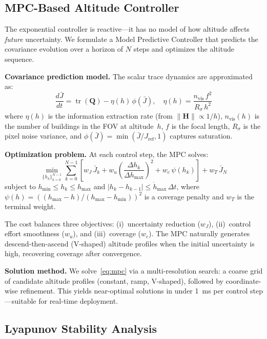 \documentclass[journal]{IEEEtran}
\newcommand{\vQ}{\mathbf{Q}}
\newcommand{\vH}{\mathbf{H}}
\newcommand{\tr}{\operatorname{tr}}
\begin{document}
\subsection{MPC-Based Altitude Controller}\label{sec:mpc}
The exponential controller is reactive---it has no model of how altitude affects \emph{future} uncertainty.
We formulate a Model Predictive Controller that predicts the covariance evolution over a horizon of $N$ steps and optimizes the altitude sequence.

\textbf{Covariance prediction model.}
The scalar trace dynamics are approximated as:
\begin{equation}\label{eq:trace_dyn}
    \frac{d\bar{J}}{dt} = \tr(\vQ) - \eta(h)\,\phi(\bar{J}), \quad \eta(h) = \frac{n_{\text{vis}}\,f^2}{R_\sigma\,h^2}
\end{equation}
where $\eta(h)$ is the information extraction rate (from $\|\vH\| \propto 1/h$), $n_{\text{vis}}(h)$ is the number of buildings in the FOV at altitude~$h$, $f$ is the focal length, $R_\sigma$ is the pixel noise variance, and $\phi(\bar{J}) = \min(\bar{J}/J_{\text{ref}}, 1)$ captures saturation.

\textbf{Optimization problem.}
At each control step, the MPC solves:
\begin{equation}\label{eq:mpc}
\min_{\{h_k\}_{k=0}^{N-1}} \sum_{k=0}^{N-1}\!\left[w_J\,\bar{J}_k + w_u\left(\frac{\Delta h_k}{\Delta h_{\max}}\right)^{\!2} + w_c\,\psi(h_k)\right] + w_T\,\bar{J}_N
\end{equation}
subject to $h_{\min} \leq h_k \leq h_{\max}$ and $|h_k - h_{k-1}| \leq \dot{h}_{\max}\,\Delta t$, where $\psi(h) = ((h_{\max}{-}h)/(h_{\max}{-}h_{\min}))^2$ is a coverage penalty and $w_T$ is the terminal weight.

The cost balances three objectives: (i)~uncertainty reduction ($w_J$), (ii)~control effort smoothness ($w_u$), and (iii)~coverage ($w_c$).
The MPC naturally generates descend-then-ascend (V-shaped) altitude profiles when the initial uncertainty is high, recovering coverage after convergence.

\textbf{Solution method.}
We solve~\eqref{eq:mpc} via a multi-resolution search: a coarse grid of candidate altitude profiles (constant, ramp, V-shaped), followed by coordinate-wise refinement.
This yields near-optimal solutions in under \SI{1}{ms} per control step---suitable for real-time deployment.

\subsection{Lyapunov Stability Analysis}\label{sec:lyapunov}
\end{document}
